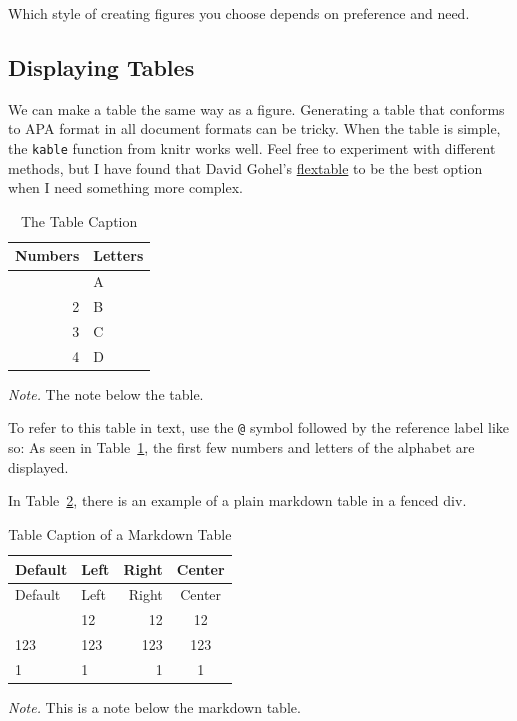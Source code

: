 \documentclass[
  jou,
  floatsintext,
  longtable,
  nolmodern,
  notxfonts,
  notimes,
  colorlinks=true,linkcolor=blue,citecolor=blue,urlcolor=blue]{apa7}
\begin{document}
Which style of creating figures you choose depends on preference and
need.

\subsection{Displaying Tables}\label{displaying-tables}

We can make a table the same way as a figure. Generating a table that
conforms to APA format in all document formats can be tricky. When the
table is simple, the \texttt{kable} function from knitr works well. Feel
free to experiment with different methods, but I have found that David
Gohel's \href{https://davidgohel.github.io/flextable/}{flextable} to be
the best option when I need something more complex.

\begin{ThreePartTable}

\begin{longtable}[]{@{}rl@{}}

\caption{\label{tbl-mytable}The Table Caption}

\tabularnewline

\toprule\noalign{}
Numbers & Letters \\
\midrule\noalign{}
\endhead
\bottomrule\noalign{}
\endlastfoot
1 & A \\
2 & B \\
3 & C \\
4 & D \\

\end{longtable}

{\noindent \emph{Note.} The note below the table.}

\end{ThreePartTable}

To refer to this table in text, use the \texttt{@} symbol followed by
the reference label like so: As seen in Table~\ref{tbl-mytable}, the
first few numbers and letters of the alphabet are displayed.

In Table~\ref{tbl-mymarkdowntable}, there is an example of a plain
markdown table in a fenced div.

\begin{ThreePartTable}

\begin{longtable}[]{@{}llrc@{}}
\caption{Table Caption of a Markdown
Table}\label{tbl-mymarkdowntable}\tabularnewline
\toprule\noalign{}
Default & Left & Right & Center \\
\midrule\noalign{}
\endfirsthead
\toprule\noalign{}
Default & Left & Right & Center \\
\midrule\noalign{}
\endhead
\bottomrule\noalign{}
\endlastfoot
12 & 12 & 12 & 12 \\
123 & 123 & 123 & 123 \\
1 & 1 & 1 & 1 \\
\end{longtable}

{\noindent \emph{Note.} This is a note below the markdown table.}

\end{ThreePartTable}
\end{document}
